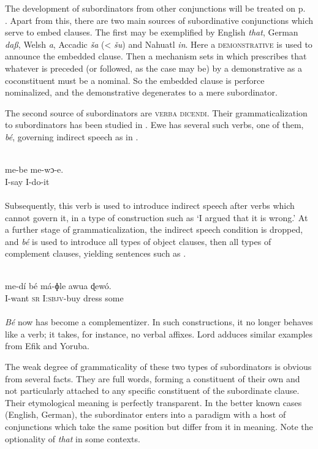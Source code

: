 The development of subordinators from other conjunctions will be treated on p.~\pageref{page70}\chk%
 . Apart from this, there are two main sources of subordinative conjunctions which serve to embed clauses. The first may be exemplified by English \textit{that}, German \textit{daß}, Welsh \textit{a}, Accadic \textit{ša} ({\textless} \textit{šu}) and Nahuatl \textit{in}. Here a \textsc{demonstrative} is used to announce the embedded clause. Then a mechanism sets in which prescribes that whatever is preceded (or followed, as the case may be) by a demonstrative as a coconstituent must be a nominal. So the embedded clause is perforce nominalized, and the demonstrative degenerates to a mere subordinator.

The second source of subordinators are \textsc{verba dicendi}. Their grammaticalization to subordinators has been studied in \citet{Lord1976}. Ewe has several such verbs, one of them, \textit{bé}, governing indirect speech as in .

\ea\label{ex:E26}
\\
\gll me-be 
 me-wɔ-e.\\
 I-say  I-do-it\\
\\
\z
\noindent Subsequently, this verb is used to introduce indirect speech after verbs which cannot govern it, in a type of construction such as ‘I argued that it is wrong.’ At a further stage of grammaticalization, the indirect speech condition is dropped, and \textit{bé} is used to introduce all types of object clauses, then all types of complement clauses, yielding sentences such as .

\newpage
\ea\label{ex:E27}
\\
\gll me-dí  bé  má-ɸle  awua  ɖewó.\\
 I-want  \textsc{sr}  I:\textsc{sbjv}-buy  dress  some\\
\\
\z
\noindent \textit{Bé} now has become a complementizer. In such constructions, it no longer behaves like a verb; it takes, for instance, no verbal affixes. Lord adduces similar examples from Efik and Yoruba.

The weak degree of grammaticality of these two types of subordinators is obvious from several facts. They are full words, forming a constituent of their own and not particularly attached to any specific constituent of the subordinate clause. Their etymological meaning is perfectly transparent. In the better known cases (English, German), the subordinator enters into a paradigm with a host of conjunctions which take the same position but differ from it in meaning. Note the optionality of \textit{that} in some contexts.

